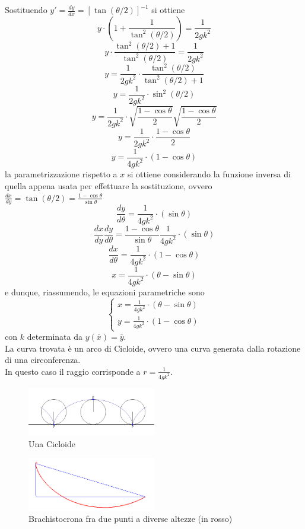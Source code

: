 Sostituendo $ y' = \frac{dy}{dx} = \left[ \tan(\theta/2) \right]^{-1} $ si ottiene
\[ y \cdot (1 + \frac{1}{\tan^2(\theta/2)} ) = \frac{1}{2gk^2} \]
\[ y \cdot \frac{\tan^2(\theta/2) + 1}{\tan^2(\theta/2)} = \frac{1}{2gk^2} \]
\[ y = \frac{1}{2gk^2} \cdot \frac{\tan^2(\theta/2)}{\tan^2(\theta/2) + 1} \]
\[ y = \frac{1}{2gk^2} \cdot \sin^2(\theta/2) \]
\[ y = \frac{1}{2gk^2} \cdot \sqrt{\frac{1 - \cos \theta}{2}} \sqrt{\frac{1 - \cos \theta}{2}} \]
\[ y = \frac{1}{2gk^2} \cdot \frac{1 - \cos \theta}{2} \]
\[ y = \frac{1}{4gk^2} \cdot \left(1 - \cos \theta\right) \]
la parametrizzazione rispetto a $x$ si ottiene considerando la funzione inversa di quella appena usata per effettuare la sostituzione, ovvero
$ \frac{dx}{dy} = \tan(\theta/2) = \frac{1 - \cos \theta}{\sin \theta} $
\[ \frac{dy}{d\theta} = \frac{1}{4gk^2} \cdot \left(\sin \theta\right) \]
\[ \frac{dx}{dy} \frac{dy}{d\theta} = \frac{1 - \cos \theta}{\sin \theta} \frac{1}{4gk^2} \cdot \left(\sin \theta\right) \]
\[ \frac{dx}{d\theta} = \frac{1}{4gk^2} \cdot \left(1 - \cos \theta\right) \]
\[ x = \frac{1}{4gk^2} \cdot \left(\theta - \sin \theta\right) \]
e dunque, riassumendo, le equazioni parametriche sono
\[
	\begin{cases}
		x = \frac{1}{4gk^2} \cdot \left(\theta - \sin \theta\right)\\
		y = \frac{1}{4gk^2} \cdot \left(1 - \cos \theta\right)
	\end{cases}
\]
con $k$ determinata da $ y(\bar{x}) = \bar{y} $.\\
La curva trovata è un arco di Cicloide, ovvero una curva generata dalla rotazione di una circonferenza.\\
In questo caso il raggio corrisponde a $ r = \frac{1}{4gk^2} $.\\
\newpage
\begin{figure}[h]
	\caption{Una Cicloide}
	\centering
	\includegraphics[width=0.5\textwidth]{images/Cicloide.png}
\end{figure}
\begin{figure}[h]
	\caption{Brachistocrona fra due punti a diverse altezze (in rosso)}
	\centering
	\includegraphics[width=0.5\textwidth]{images/Brachistochrone.png}
\end{figure}
